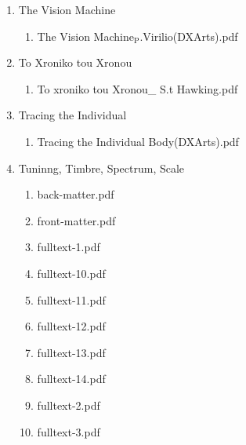 \documentclass[11pt]{article}
\begin{document}
\begin{enumerate}
\item The Vision Machine
\label{sec-1-1-1-1-49-1-5-25}
\begin{enumerate}
\item The Vision Machine$_{\text{P}}$.Virilio(DXArts).pdf
\label{sec-1-1-1-1-49-1-5-25-1}
\end{enumerate}

\item To Xroniko tou Xronou
\label{sec-1-1-1-1-49-1-5-26}
\begin{enumerate}
\item To xroniko tou Xronou\_ S.t Hawking.pdf
\label{sec-1-1-1-1-49-1-5-26-1}
\end{enumerate}

\item Tracing the Individual
\label{sec-1-1-1-1-49-1-5-27}
\begin{enumerate}
\item Tracing the Individual Body(DXArts).pdf
\label{sec-1-1-1-1-49-1-5-27-1}
\end{enumerate}

\item Tuninng, Timbre, Spectrum, Scale
\label{sec-1-1-1-1-49-1-5-28}
\begin{enumerate}
\item back-matter.pdf
\label{sec-1-1-1-1-49-1-5-28-1}

\item front-matter.pdf
\label{sec-1-1-1-1-49-1-5-28-2}

\item fulltext-1.pdf
\label{sec-1-1-1-1-49-1-5-28-3}

\item fulltext-10.pdf
\label{sec-1-1-1-1-49-1-5-28-4}

\item fulltext-11.pdf
\label{sec-1-1-1-1-49-1-5-28-5}

\item fulltext-12.pdf
\label{sec-1-1-1-1-49-1-5-28-6}

\item fulltext-13.pdf
\label{sec-1-1-1-1-49-1-5-28-7}

\item fulltext-14.pdf
\label{sec-1-1-1-1-49-1-5-28-8}

\item fulltext-2.pdf
\label{sec-1-1-1-1-49-1-5-28-9}

\item fulltext-3.pdf
\label{sec-1-1-1-1-49-1-5-28-10}


\end{enumerate}
\end{enumerate}
\end{document}
